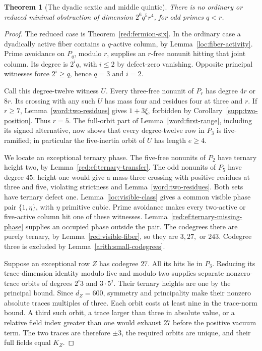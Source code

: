 \documentclass[11pt,a4paper]{article}
\numberwithin{equation}{section}
\newtheorem{theorem}{Theorem}[section]
\begin{document}
\begin{theorem}[The dyadic sextic and middle quintic]
\label{red:ef:sextic-quintic-face}
There is no ordinary or reduced minimal obstruction of dimension
$2^6q^5r^4$, for odd primes $q<r$.
\end{theorem}
\begin{proof}
The reduced case is Theorem~\ref{red:fermion-six}. In the ordinary
case a dyadically active fiber contains a $q$-active column, by
Lemma~\ref{loc:fiber-activity}. Prime avoidance on $P_q$, modulo
$r$, supplies an $r$-free nonunit hitting that joint column. Its
degree is $2^iq$, with $i\le2$ by defect-zero vanishing. Opposite
principal witnesses force $2^i\ge q$, hence $q=3$ and $i=2$.

Call this degree-twelve witness $U$. Every three-free nonunit of
$P_r$ has degree $4r$ or $8r$. Its crossing with any such $U$ has
mass four and residues four at three and $r$. If $r\ge7$,
Lemma~\ref{word:two-residues} gives $1+3\xi$, forbidden by
Corollary~\ref{supp:two-position}. Thus $r=5$. The full-orbit part of
Lemma~\ref{word:first-range}, including its signed alternative,
now shows that every degree-twelve row in $P_3$ is five-ramified;
in particular the five-inertia orbit of $U$ has length $e\ge4$.

We locate an exceptional ternary phase. The five-free nonunits of
$P_2$ have ternary height two, by
Lemma~\ref{red:ef:ternary-transfer}. The odd nonunits of $P_5$
have degree $45$: height one would give a mass-three crossing with
positive residues at three and five, violating strictness and
Lemma~\ref{word:two-residues}. Both sets have ternary defect one.
Lemma~\ref{loc:visible-class} gives a common visible phase pair
$\{1,\eta\}$, with $\eta$ primitive cubic. Prime avoidance makes
every two-active or five-active column hit one of these witnesses.
Lemma~\ref{red:ef:ternary-missing-phase} supplies an occupied phase
outside the pair. The codegrees there are purely ternary, by
Lemma~\ref{red:visible-fiber}, so they are $3,27,$ or $243$.
Codegree three is excluded by Lemma~\ref{arith:small-codegrees}.

Suppose an exceptional row $Z$ has codegree $27$. All its hits lie
in $P_3$. Reducing its trace-dimension identity modulo five and
modulo two supplies separate nonzero-trace orbits of degrees
$2^i3$ and $3\cdot5^j$. Their ternary heights are one by the
principal bound. Since $d_Z=600$, symmetry and principality make
their nonzero absolute traces multiples of three. Each orbit costs
at least nine in the trace-norm bound. A third such orbit, a trace
larger than three in absolute value, or a relative field index
greater than one would exhaust $27$ before the positive vacuum
term. The two traces are therefore $\pm3$, the required orbits are
unique, and their full fields equal $K_Z$.


\end{proof}
\end{document}
